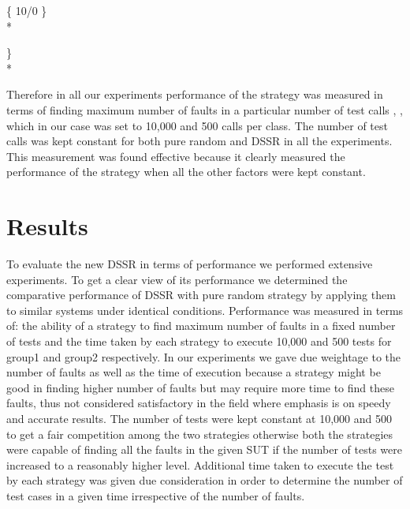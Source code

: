 \documentclass[10pt, conference, compsocconf]{IEEEtran}
\begin{document}
\hspace{07 mm}\{ 10/0 \} \\* 

\} \\*

Therefore in all our experiments performance of the strategy was measured in terms of finding maximum number of faults in a particular number of test calls  \cite{Ciupa2007}, \cite{Pacheco2007a}, \cite{Ciupa2008b} which in our case was set to 10,000 and 500 calls per class. The number of test calls was kept constant for both pure random and DSSR in all the experiments. This measurement was found effective because it clearly measured the performance of the strategy when all the other factors were kept constant.



\section{Results}\label{sec:results}
To evaluate the new DSSR in terms of performance we performed extensive experiments. To get a clear view of its performance we determined the comparative performance of DSSR with pure random strategy by applying them to similar systems under identical conditions. Performance was measured in terms of: the ability of a strategy to find maximum number of faults in a fixed number of tests and the time taken by each strategy to execute 10,000 and 500 tests for group1 and group2 respectively. In our experiments we gave due weightage to the number of faults as well as the time of execution because a strategy might be good in finding higher number of faults but may require more time to find these faults, thus not considered satisfactory in the field where emphasis is on speedy and accurate results. The number of tests were kept constant at 10,000 and 500 to get a fair competition among the two strategies otherwise both the strategies were capable of finding all the faults in the given SUT if the number of tests were increased to a reasonably higher level. Additional time taken to execute the test by each strategy was given due consideration in order to determine the number of test cases in a given time irrespective of the number of faults. 
\end{document}
